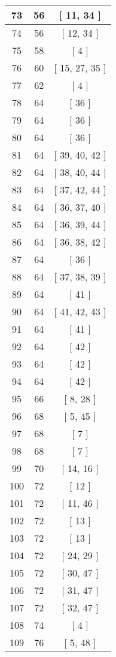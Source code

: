 \begin{center}
\begin{longtable}[H]{|| c c c ||}
\hline
73 & 56 & [ 11, 34 ] \\ 
\hline
74 & 56 & [ 12, 34 ] \\ 
\hline
75 & 58 & [ 4 ] \\ 
\hline
76 & 60 & [ 15, 27, 35 ] \\ 
\hline
77 & 62 & [ 4 ] \\ 
\hline
78 & 64 & [ 36 ] \\ 
\hline
79 & 64 & [ 36 ] \\ 
\hline
80 & 64 & [ 36 ] \\ 
\hline
81 & 64 & [ 39, 40, 42 ] \\ 
\hline
82 & 64 & [ 38, 40, 44 ] \\ 
\hline
83 & 64 & [ 37, 42, 44 ] \\ 
\hline
84 & 64 & [ 36, 37, 40 ] \\ 
\hline
85 & 64 & [ 36, 39, 44 ] \\ 
\hline
86 & 64 & [ 36, 38, 42 ] \\ 
\hline
87 & 64 & [ 36 ] \\ 
\hline
88 & 64 & [ 37, 38, 39 ] \\ 
\hline
89 & 64 & [ 41 ] \\ 
\hline
90 & 64 & [ 41, 42, 43 ] \\ 
\hline
91 & 64 & [ 41 ] \\ 
\hline
92 & 64 & [ 42 ] \\ 
\hline
93 & 64 & [ 42 ] \\ 
\hline
94 & 64 & [ 42 ] \\ 
\hline
95 & 66 & [ 8, 28 ] \\ 
\hline
96 & 68 & [ 5, 45 ] \\ 
\hline
97 & 68 & [ 7 ] \\ 
\hline
98 & 68 & [ 7 ] \\ 
\hline
99 & 70 & [ 14, 16 ] \\ 
\hline
100 & 72 & [ 12 ] \\ 
\hline
101 & 72 & [ 11, 46 ] \\ 
\hline
102 & 72 & [ 13 ] \\ 
\hline
103 & 72 & [ 13 ] \\ 
\hline
104 & 72 & [ 24, 29 ] \\ 
\hline
105 & 72 & [ 30, 47 ] \\ 
\hline
106 & 72 & [ 31, 47 ] \\ 
\hline
107 & 72 & [ 32, 47 ] \\ 
\hline
108 & 74 & [ 4 ] \\ 
\hline
109 & 76 & [ 5, 48 ] \\ 

\end{longtable}
\end{center}
